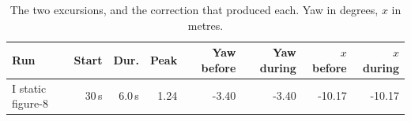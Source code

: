 \begin{table}[htbp]
\centering\small
\caption{The two excursions, and the correction that produced each. Yaw in degrees, $x$ in metres.}
\label{tab:insight4nav-exc}
\begin{tabular}{lrrrrrrr}
\toprule
Run & Start & Dur. & Peak & Yaw before & Yaw during & $x$ before & $x$ during \\
\midrule
I static figure-8 & 30\,s & 6.0\,s & 1.24 & -3.40 & -3.40 & -10.17 & -10.17 \\
\bottomrule
\end{tabular}
\end{table}
